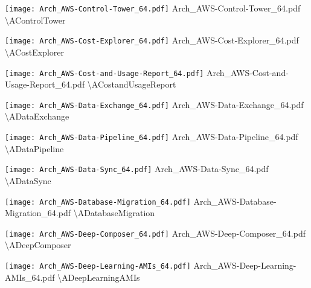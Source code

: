  {\texttt{[image: Arch\_AWS-Control-Tower\_64.pdf]}} {Arch\_AWS-Control-Tower\_64.pdf} {{\textbackslash}AControlTower}

 {\texttt{[image: Arch\_AWS-Cost-Explorer\_64.pdf]}} {Arch\_AWS-Cost-Explorer\_64.pdf} {{\textbackslash}ACostExplorer}

 {\texttt{[image: Arch\_AWS-Cost-and-Usage-Report\_64.pdf]}} {Arch\_AWS-Cost-and-Usage-Report\_64.pdf} {{\textbackslash}ACostandUsageReport}

 {\texttt{[image: Arch\_AWS-Data-Exchange\_64.pdf]}} {Arch\_AWS-Data-Exchange\_64.pdf} {{\textbackslash}ADataExchange}

 {\texttt{[image: Arch\_AWS-Data-Pipeline\_64.pdf]}} {Arch\_AWS-Data-Pipeline\_64.pdf} {{\textbackslash}ADataPipeline}

 {\texttt{[image: Arch\_AWS-Data-Sync\_64.pdf]}} {Arch\_AWS-Data-Sync\_64.pdf} {{\textbackslash}ADataSync}

 {\texttt{[image: Arch\_AWS-Database-Migration\_64.pdf]}} {Arch\_AWS-Database-Migration\_64.pdf} {{\textbackslash}ADatabaseMigration}

 {\texttt{[image: Arch\_AWS-Deep-Composer\_64.pdf]}} {Arch\_AWS-Deep-Composer\_64.pdf} {{\textbackslash}ADeepComposer}

 {\texttt{[image: Arch\_AWS-Deep-Learning-AMIs\_64.pdf]}} {Arch\_AWS-Deep-Learning-AMIs\_64.pdf} {{\textbackslash}ADeepLearningAMIs}

